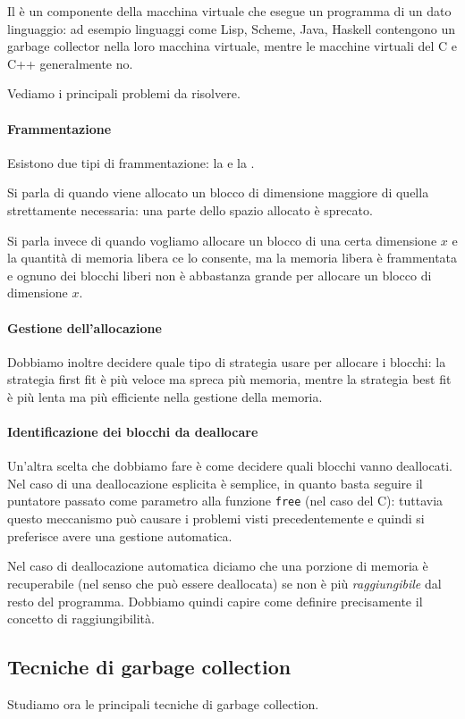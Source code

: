 Il  è un componente della macchina virtuale che esegue un programma di un dato linguaggio: ad esempio linguaggi come Lisp, Scheme, Java, Haskell contengono un garbage collector nella loro macchina virtuale, mentre le macchine virtuali del C e C++ generalmente no.

Vediamo i principali problemi da risolvere.
\paragraph{Frammentazione} Esistono due tipi di frammentazione: la  e la . 

Si parla di  quando viene allocato un blocco di dimensione maggiore di quella strettamente necessaria: una parte dello spazio allocato è sprecato.

Si parla invece di  quando vogliamo allocare un blocco di una certa dimensione $x$ e la quantità di memoria libera ce lo consente, ma la memoria libera è frammentata e ognuno dei blocchi liberi non è abbastanza grande per allocare un blocco di dimensione $x$.

\paragraph{Gestione dell'allocazione} Dobbiamo inoltre decidere quale tipo di strategia usare per allocare i blocchi: la strategia first fit è più veloce ma spreca più memoria, mentre la strategia best fit è più lenta ma più efficiente nella gestione della memoria.

\paragraph{Identificazione dei blocchi da deallocare} Un'altra scelta che dobbiamo fare è come decidere quali blocchi vanno deallocati. Nel caso di una deallocazione esplicita è semplice, in quanto basta seguire il puntatore passato come parametro alla funzione \texttt{free} (nel caso del C): tuttavia questo meccanismo può causare i problemi visti precedentemente e quindi si preferisce avere una gestione automatica.

Nel caso di deallocazione automatica diciamo che una porzione di memoria è recuperabile (nel senso che può essere deallocata) se non è più \emph{raggiungibile} dal resto del programma. Dobbiamo quindi capire come definire precisamente il concetto di raggiungibilità.

\subsection*{Tecniche di garbage collection}

Studiamo ora le principali tecniche di garbage collection.